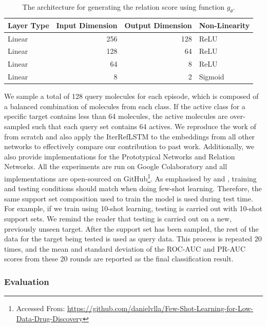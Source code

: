\begin{table}[h]
	\centering
	\begin{tabular}{@{}lrrl@{}}
	\hline
	Layer Type & Input Dimension & Output Dimension & Non-Linearity \\
	\hline
	Linear 	& 256 	& 128 	& ReLU \\
	Linear 	& 128 	& 64 	& ReLU \\
	Linear 	& 64 	& 8 	& ReLU \\
	Linear 	& 8 	& 2 	& Sigmoid \\
	\hline
	\end{tabular}
	\caption{The architecture for generating the relation score using function $g_\theta$.}
	\label{table:relation-neural-net}
\end{table}

We sample a total of 128 query molecules for each episode, which is composed of a balanced combination of molecules from each class. If the active class for a specific target contains less than 64 molecules, the active molecules are over-sampled such that each query set contains 64 actives. We reproduce the work of \citet{altae2017low} from scratch and also apply the IterRefLSTM to the embeddings from all other networks to effectively compare our contribution to past work. Additionally, we also provide implementations for the Prototypical Networks and Relation Networks. All the experiments are run on Google Colaboratory and all implementations are open-sourced on GitHub\footnote{Accessed From: \url{https://github.com/danielvlla/Few-Shot-Learning-for-Low-Data-Drug-Discovery}}. As  emphasised by \citet{vinyals2016matching} and \citet{snell2017prototypical}, training and testing conditions should match when doing few-shot learning. Therefore, the same support set composition used to train the model is used during test time. For example, if we train using 10-shot learning, testing is carried out with 10-shot support sets. We remind the reader that testing is carried out on a new, previously unseen target. After the support set has been sampled, the rest of the data for the target being tested is used as query data. This process is repeated 20 times, and the mean and standard deviation of the ROC-AUC and PR-AUC scores from these 20 rounds are reported as the final classification result.

\subsubsection{Evaluation}

